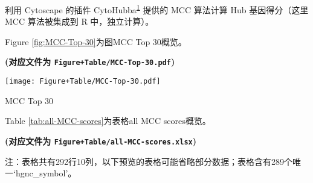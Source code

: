 \documentclass[
]{article}
\begin{document}
利用 Cytoscape 的插件 CytoHubba\textsuperscript{\protect\hyperlink{ref-CytohubbaIdenChin2014}{1}} 提供的 MCC 算法计算
Hub 基因得分（这里 MCC 算法被集成到 R 中，独立计算）。

Figure \ref{fig:MCC-Top-30}为图MCC Top 30概览。

\textbf{(对应文件为 \texttt{Figure+Table/MCC-Top-30.pdf})}

\def\@captype{figure}
\begin{center}
\texttt{[image: Figure+Table/MCC-Top-30.pdf]}
\caption{MCC Top 30}\label{fig:MCC-Top-30}
\end{center}

Table \ref{tab:all-MCC-scores}为表格all MCC scores概览。

\textbf{(对应文件为 \texttt{Figure+Table/all-MCC-scores.xlsx})}

\begin{center}\begin{tcolorbox}[colback=gray!10, colframe=gray!50, width=0.9\linewidth, arc=1mm, boxrule=0.5pt]注：表格共有292行10列，以下预览的表格可能省略部分数据；表格含有289个唯一`hgnc\_symbol'。
\end{tcolorbox}
\end{center}
\end{document}
